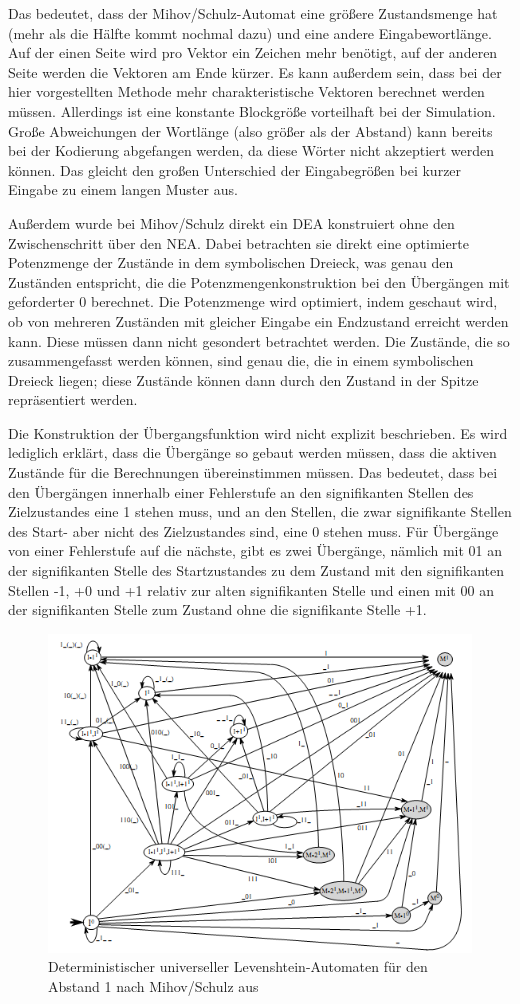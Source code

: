 Das bedeutet, dass der Mihov/Schulz-Automat eine größere Zustandsmenge hat (mehr als die Hälfte kommt nochmal dazu) und eine andere Eingabewortlänge. Auf der einen Seite wird pro Vektor ein Zeichen mehr benötigt, auf der anderen Seite werden die Vektoren am Ende kürzer. Es kann außerdem sein, dass bei der hier vorgestellten Methode mehr charakteristische Vektoren berechnet werden müssen. Allerdings ist eine konstante Blockgröße vorteilhaft bei der Simulation. Große Abweichungen der Wortlänge (also größer als der Abstand) kann bereits bei der Kodierung abgefangen werden, da diese Wörter nicht akzeptiert werden können. Das gleicht den großen Unterschied der Eingabegrößen bei kurzer Eingabe zu einem langen Muster aus.

Außerdem wurde bei Mihov/Schulz direkt ein DEA konstruiert ohne den Zwischenschritt über den NEA. Dabei betrachten sie direkt eine optimierte Potenzmenge der Zustände in dem symbolischen Dreieck, was genau den Zuständen entspricht, die die Potenzmengenkonstruktion bei den Übergängen mit geforderter 0 berechnet. Die Potenzmenge wird optimiert, indem geschaut wird, ob von mehreren Zuständen mit gleicher Eingabe ein Endzustand erreicht werden kann. Diese müssen dann nicht gesondert betrachtet werden. Die Zustände, die so zusammengefasst werden können, sind genau die, die in einem symbolischen Dreieck liegen; diese Zustände können dann durch den Zustand in der Spitze repräsentiert werden.

Die Konstruktion der Übergangsfunktion wird nicht explizit beschrieben. Es wird lediglich erklärt, dass die Übergänge so gebaut werden müssen, dass die aktiven Zustände für die Berechnungen übereinstimmen müssen. Das bedeutet, dass bei den Übergängen innerhalb einer Fehlerstufe an den signifikanten Stellen des Zielzustandes eine 1 stehen muss, und an den Stellen, die zwar signifikante Stellen des Start- aber nicht des Zielzustandes sind, eine 0 stehen muss. Für Übergänge von einer Fehlerstufe auf die nächste, gibt es zwei Übergänge, nämlich mit 01 an der signifikanten Stelle des Startzustandes zu dem Zustand mit den signifikanten Stellen -1, +0 und +1 relativ zur alten signifikanten Stelle und einen mit 00 an der signifikanten Stelle zum Zustand ohne die signifikante Stelle +1.

\begin{figure}[htbp]
\centering
\includegraphics{pic/automata/unidlevenshteinmihov}%
\caption{Deterministischer universeller Levenshtein-Automaten für den Abstand 1 nach Mihov/Schulz aus \cite{lit01}}%
\end{figure}
\endinput
